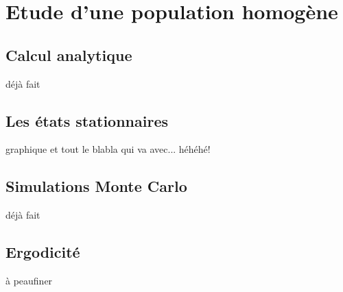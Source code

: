 \chapter{Etude d'une population homogène}

\section{Calcul analytique}
déjà fait

\section{Les états stationnaires}
graphique et tout le blabla qui va avec... héhéhé!

\section{Simulations Monte Carlo}
déjà fait

\section{Ergodicité}
à peaufiner